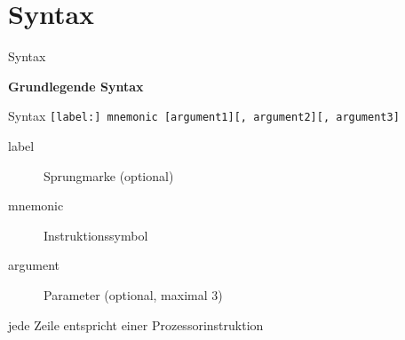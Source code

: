 \section{Syntax}

\begin{frame}{Syntax}
\begin{center}
\textbf{Grundlegende Syntax}
\end{center}

	Syntax
	\texttt{[label:] mnemonic [argument1][, argument2][, argument3]}

	\makebox{}

	\begin{description}
		\item [label] Sprungmarke (optional)
		\item [mnemonic] Instruktionssymbol 
		\item [argument] Parameter (optional, maximal 3)
	\end{description}

	\makebox{}

	jede Zeile entspricht einer Prozessorinstruktion  
\end{frame}


